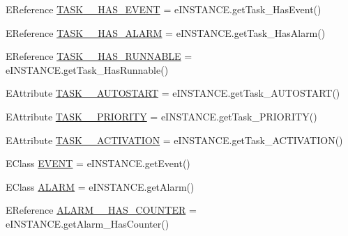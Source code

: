\begin{DoxyCompactItemize}
\item 
E\-Reference \hyperlink{interfaceshootingmachineemfmodel_1_1_shootingmachineemfmodel_package_1_1_literals_a3ce372c79cc7d3893756d575f849f232}{T\-A\-S\-K\-\_\-\-\_\-\-H\-A\-S\-\_\-\-E\-V\-E\-N\-T} = e\-I\-N\-S\-T\-A\-N\-C\-E.\-get\-Task\-\_\-\-Has\-Event()
\item 
E\-Reference \hyperlink{interfaceshootingmachineemfmodel_1_1_shootingmachineemfmodel_package_1_1_literals_a765d7ba7a3095109fbd494db4df0967e}{T\-A\-S\-K\-\_\-\-\_\-\-H\-A\-S\-\_\-\-A\-L\-A\-R\-M} = e\-I\-N\-S\-T\-A\-N\-C\-E.\-get\-Task\-\_\-\-Has\-Alarm()
\item 
E\-Reference \hyperlink{interfaceshootingmachineemfmodel_1_1_shootingmachineemfmodel_package_1_1_literals_a8179b43f089e2fe704940ce814273d02}{T\-A\-S\-K\-\_\-\-\_\-\-H\-A\-S\-\_\-\-R\-U\-N\-N\-A\-B\-L\-E} = e\-I\-N\-S\-T\-A\-N\-C\-E.\-get\-Task\-\_\-\-Has\-Runnable()
\item 
E\-Attribute \hyperlink{interfaceshootingmachineemfmodel_1_1_shootingmachineemfmodel_package_1_1_literals_afd79e5d39bbbc1e8abfc2a8972ffb89f}{T\-A\-S\-K\-\_\-\-\_\-\-A\-U\-T\-O\-S\-T\-A\-R\-T} = e\-I\-N\-S\-T\-A\-N\-C\-E.\-get\-Task\-\_\-\-A\-U\-T\-O\-S\-T\-A\-R\-T()
\item 
E\-Attribute \hyperlink{interfaceshootingmachineemfmodel_1_1_shootingmachineemfmodel_package_1_1_literals_a6860394b9f9e403b44382ad8d19b97b3}{T\-A\-S\-K\-\_\-\-\_\-\-P\-R\-I\-O\-R\-I\-T\-Y} = e\-I\-N\-S\-T\-A\-N\-C\-E.\-get\-Task\-\_\-\-P\-R\-I\-O\-R\-I\-T\-Y()
\item 
E\-Attribute \hyperlink{interfaceshootingmachineemfmodel_1_1_shootingmachineemfmodel_package_1_1_literals_a65c54662ff66e19e120f5c6774c3b06e}{T\-A\-S\-K\-\_\-\-\_\-\-A\-C\-T\-I\-V\-A\-T\-I\-O\-N} = e\-I\-N\-S\-T\-A\-N\-C\-E.\-get\-Task\-\_\-\-A\-C\-T\-I\-V\-A\-T\-I\-O\-N()
\item 
E\-Class \hyperlink{interfaceshootingmachineemfmodel_1_1_shootingmachineemfmodel_package_1_1_literals_a8e5ee3967fe2449de19ff6be4e31d7ec}{E\-V\-E\-N\-T} = e\-I\-N\-S\-T\-A\-N\-C\-E.\-get\-Event()
\item 
E\-Class \hyperlink{interfaceshootingmachineemfmodel_1_1_shootingmachineemfmodel_package_1_1_literals_a563965a1017bffb037517fdc4bd5a6d5}{A\-L\-A\-R\-M} = e\-I\-N\-S\-T\-A\-N\-C\-E.\-get\-Alarm()
\item 
E\-Reference \hyperlink{interfaceshootingmachineemfmodel_1_1_shootingmachineemfmodel_package_1_1_literals_abf4df8fa2e20260ce52dae666db65983}{A\-L\-A\-R\-M\-\_\-\-\_\-\-H\-A\-S\-\_\-\-C\-O\-U\-N\-T\-E\-R} = e\-I\-N\-S\-T\-A\-N\-C\-E.\-get\-Alarm\-\_\-\-Has\-Counter()

\end{DoxyCompactItemize}
